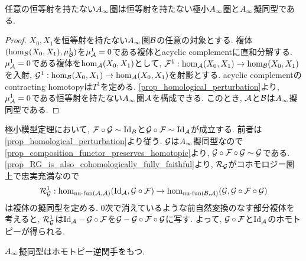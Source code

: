 \documentclass[uplatex, a4paper, 14Q, dvipdfmx]{jsarticle}
\begin{document}

\begin{theorem}[極小模型定理] \label{prop_minimal_model_theorem}
  任意の恒等射を持たない$A_{\infty}$圏は恒等射を持たない極小$A_{\infty}$圏と$A_{\infty}$擬同型である. 
\end{theorem}

\begin{proof}
  $X_0,X_1$を恒等射を持たない$A_{\infty}$圏$\mathcal{B}$の任意の対象とする. 
  複体$(\hom_{\mathcal{B}}(X_0,X_1), \mu^1_{\mathcal{B}})$を$\mu^1_{\mathcal{A}}= 0$である複体とacyclic complementに直和分解する. 
  $\mu^1_{\mathcal{A}}=0$である複体を$\hom_{\mathcal{A}}(X_0,X_1)$として, $\mathcal{F}^1 : \hom_{\mathcal{A}}(X_0,X_1) \to \hom_{\mathcal{B}}(X_0,X_1)$を入射, $\mathcal{G}^1 : \hom_{\mathcal{B}}(X_0,X_1) \to \hom_{\mathcal{A}}(X_0,X_1)$を射影とする. 
  acyclic complementのcontracting homotopyは$T^1$を定める. 
  \cref{prop_homological_perturbation}より, $\mu^1_{\mathcal{A}}=0$である恒等射を持たない$A_{\infty}$圏$\mathcal{A}$を構成できる. 
  このとき, $\mathcal{A}$と$\mathcal{B}$は$A_{\infty}$擬同型である.
\end{proof}

\begin{remark}
  極小模型定理において, $\mathcal{F} \circ \mathcal{G} \sim \mathrm{Id}_B$と$\mathcal{G} \circ \mathcal{F} \sim \mathrm{Id}_{\mathcal{A}}$が成立する. 
  前者は\cref{prop_homological_perturbation}より従う. 
  $\mathcal{G}$は$A_{\infty}$擬同型なので\cref{prop_composition_functor_preserves_homotopic}より, $\mathcal{G} \circ \mathcal{F} \circ \mathcal{G} \sim \mathcal{G}$である.
  \cref{prop_RG_is_also_cohomologically_fully_faithful}より, $\mathcal{R}_{\mathcal{G}}$がコホモロジー圏上で忠実充満なので
  \begin{align*}
    \mathcal{R}_{\mathcal{G}}^1 : \hom_{\mathrm{nu} \text{-} \mathrm{fun} (\mathcal{A}, \mathcal{A})}(\mathrm{Id}_{\mathcal{A}}, \mathcal{G} \circ\mathcal{F}) \to \hom_{\mathrm{nu} \text{-} \mathrm{fun} (\mathcal{B}, \mathcal{A})}(\mathcal{G}, \mathcal{G} \circ \mathcal{F} \circ \mathcal{G})
  \end{align*}
  は複体の擬同型を定める. 
  $0$次で消えているような前自然変換のなす部分複体を考えると, $\mathcal{R}_{\mathcal{G}}^1$は$\mathrm{Id}_{\mathcal{A}} - \mathcal{G} \circ\mathcal{F}$を$\mathcal{G} - \mathcal{G} \circ \mathcal{F} \circ \mathcal{G}$に写す. 
  よって, $\mathcal{G} \circ \mathcal{F}$と$\mathrm{Id}_{\mathcal{A}}$のホモトピーが得られる. 
\end{remark}

\begin{corollary} \label{prop_Ainf_qis_has_homotopy_inverse}
  $A_{\infty}$擬同型はホモトピー逆関手をもつ. 
\end{corollary}
\end{document}
